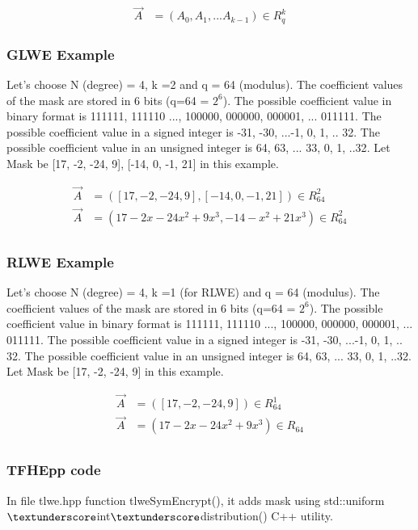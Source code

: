 \documentclass{techrep}
\theoremstyle{definition}
\theoremstyle{plain}
\begin{document}
	\begin{align*}
		\overrightarrow{A} &= (A_0,A_1,...A_{k-1}) \in R_q^k
	\end{align*}

\subsubsection{GLWE Example}

Let’s choose N (degree) = 4, k =2 and q = 64 (modulus). The coefficient values of the mask are stored in 6 bits (q=64 = $2^6$). The possible coefficient value in binary format is {111111, 111110 ..., 100000, 000000, 000001, ... 011111}. The possible coefficient value in a signed integer is {-31, -30, ...-1, 0, 1, .. 32}. The possible coefficient value in an unsigned integer is {64, 63, ... 33, 0, 1, ..32}. Let Mask be [17, -2, -24, 9], [-14, 0, -1, 21] in this example.

\begin{align*} 
\overrightarrow{A} &= ([17, -2, -24, 9], [-14, 0, -1, 21]) \in R_{64}^2 \\ 
\overrightarrow{A} &= (17-2x -24x^2 +9x^3,-14-x^2+21x^3) \in R_{64}^2 \\ 
\end{align*}

\subsubsection{RLWE Example}

Let’s choose N (degree) = 4, k =1 (for RLWE) and q = 64 (modulus). The coefficient values of the mask are stored in 6 bits (q=64 = $2^6$). The possible coefficient value in binary format is {111111, 111110 ..., 100000, 000000, 000001, ... 011111}. The possible coefficient value in a signed integer is {-31, -30, ...-1, 0, 1, .. 32}. The possible coefficient value in an unsigned integer is {64, 63, ... 33, 0, 1, ..32}. Let Mask be [17, -2, -24, 9] in this example.

\begin{align*} 
\overrightarrow{A} &= ([17, -2, -24, 9]) \in R_{64}^1 \\ 
\overrightarrow{A} &= (17-2x -24x^2 +9x^3) \in R_{64} \\ 
\end{align*}

\subsubsection{TFHEpp code}
In file tlwe.hpp function tlweSymEncrypt(), it adds mask using std::uniform$\textunderscore$int$\textunderscore$distribution() C++ utility. 
\end{document}
